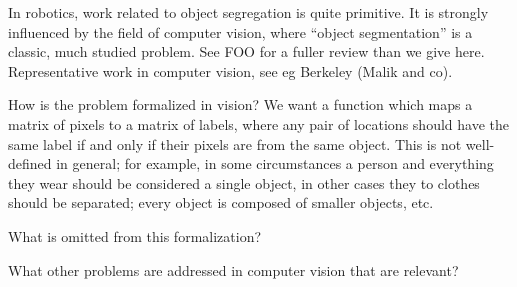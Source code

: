 In robotics, work related to object segregation is quite
primitive.  It is strongly influenced by the field
of computer vision, where ``object segmentation'' is a classic,
much studied problem.  See FOO for a fuller review than we give
here.  Representative work in computer vision,
see eg Berkeley (Malik and co).

How is the problem formalized in vision?  We want a function
which maps a matrix of pixels to a matrix of labels, where
any pair of locations should have the same label if and
only if their pixels are from the same object.
This is not well-defined in general; for example, in some
circumstances a person and everything they wear should be
considered a single object, in other cases they to clothes
should be separated; every object is composed of smaller
objects, etc.

What is omitted from this formalization?

What other problems are addressed in computer vision that
are relevant?



